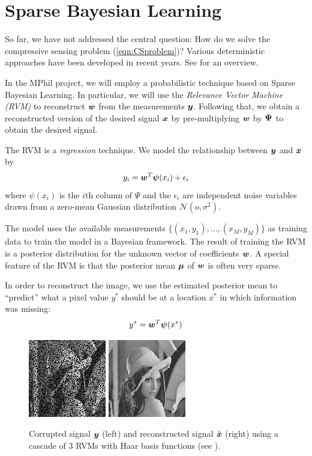 \chapter{Sparse Bayesian Learning}
So far, we have not addressed the central question: How do we solve the compressive sensing problem (\ref{eqn:CSproblem})?
Various deterministic approaches have been developed in recent years.
See \cite{pilikos2014} for an overview.

In the MPhil project, we will employ a probabilistic technique based on Sparse Bayesian Learning.
In particular, we will use the \emph{Relevance Vector Machine (RVM)} \cite{tipping2001,tipping2003} to reconstruct $\boldsymbol w$ from the measurements $\boldsymbol y$.
Following that, we obtain a reconstructed version of the desired signal $\boldsymbol x$ by pre-multiplying $\boldsymbol w$ by $\boldsymbol \Psi$ to obtain the desired signal.

The RVM is a \emph{regression} technique.
We model the relationship between $\boldsymbol y$ and $\boldsymbol x$ by
\begin{equation}
\label{eqn:rvmmodel}
y_i = \boldsymbol w^T \boldsymbol \psi(x_i) + \epsilon_i
\end{equation}
where $\psi(x_i)$ is the $i$th column of $\Psi$ and the $\epsilon_i$ are independent noise variables drawn from a zero-mean Gaussian distribution $\mathcal{N}(o,\sigma^2)$.

The model uses the available measurements $\{(x_1,y_1),\dots,(x_M,y_M)\}$ as training data to train the model in a Bayesian framework.
The result of training the RVM is a posterior distribution for the unknown vector of coefficients $\boldsymbol w$.
A special feature of the RVM is that the posterior mean $\boldsymbol \mu$ of $\boldsymbol w$ is often very sparse.

In order to reconstruct the image, we use the estimated posterior mean to ``predict'' what a pixel value $y^*$ should be at a location $x^*$ in which information was missing:
\begin{equation}
y^* = \boldsymbol w^T\boldsymbol\psi(x^*)
\end{equation}

\begin{figure}
\label{fig:lennareconstruction}
\center
\includegraphics{Images/0.png}
\includegraphics{Images/3.png}
\caption{Corrupted signal $\boldsymbol y$ (left) and reconstructed signal $\hat{\boldsymbol x}$ (right) using a cascade of 3 RVMs with Haar basis functions (see \cite{pilikos2014}).}
\end{figure}

